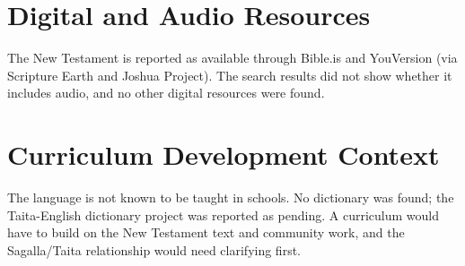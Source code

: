 \documentclass[12pt]{article}
\begin{document}
\section{Digital and Audio Resources}
The New Testament is reported as available through Bible.is and YouVersion (via Scripture Earth and Joshua Project). The search results did not show whether it includes audio, and no other digital resources were found.

\section{Curriculum Development Context}
The language is not known to be taught in schools. No dictionary was found; the Taita-English dictionary project was reported as pending. A curriculum would have to build on the New Testament text and community work, and the Sagalla/Taita relationship would need clarifying first.
\end{document}
